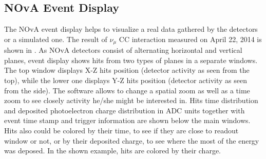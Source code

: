 \subsection{NOvA Event Display}
The NOvA event display helps to visualize a real data gathered by the detectors or a simulated one. The result
of $\nu_\mu$ CC interaction measured on April 22, 2014 is shown in \p{}. As NOvA detectors consist of alternating
horizontal and vertical planes, event display shows hits from two types of planes in a separate windows. The
top window displays X-Z hits position (detector activity as seen from the top), while the lower one displays
Y-Z hits position (detector activity as seen from the side). The software allows to change a spatial zoom as well as
a time zoom to see closely activity he/she might be interested in. Hits time distribution and deposited 
photoelectron charge distribution in ADC units together with event time stamp and trigger information are shown 
below the main windows. Hits also could be colored by their time, to see if they are close to readout window or not, 
or by their deposited charge, to see where the most of the energy was deposed. In the shown example, hits are colored
by their charge.
